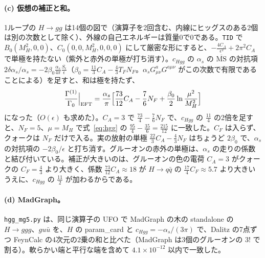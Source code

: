\documentclass[a4paper,10pt]{ltjsarticle}
\newcommand{\MSbar}{\overline{\mathrm{MS}}}
\begin{document}
\paragraph{(c) 仮想の補正と和。}1ループの $H\to gg$ は14個の図で（演算子を2回含む、内線にヒッグスのある2個は別の次数として除く）、外線の自己エネルギーは質量0で0である。\texttt{TID} で $B_0(M_H^2,0,0)$、$C_0(0,0,M_H^2,0,0,0)$ にして厳密な形にすると、$-\frac{4C_A}{\epsilon^2}+2\pi^2C_A$ で単極を持たない（紫外と赤外の単極が打ち消す）。$c_{Hgg}$ の $\alpha_s$ の $\MSbar$ の対抗項 $2\delta\alpha_s/\alpha_s=-2\beta_0\frac{\alpha_s}{4\pi}\frac{S_\epsilon}\epsilon$（$\beta_0=\frac{11}3C_A-\frac43T_FN_F$。$\alpha_sG^a_{\mu\nu}G^{a\mu\nu}$ がこの次数で有限であることによる）を足すと、和は極を持たず、
\begin{equation}
\frac{\Gamma^{(1)}}{\Gamma_0}\Big|_{\mathrm{EFT}}=\frac{\alpha_s}\pi\Bigl[\frac{73}{12}C_A-\frac76N_F+\frac{\beta_0}2\ln\frac{\mu^2}{M_H^2}\Bigr]
\label{eq:hggme}
\end{equation}
になった（$O(\epsilon)$ も求めた）。$C_A=3$ で $\frac{73}4-\frac76N_F$ で、$c_{Hgg}$ の $\frac{11}4$ の2倍を足すと、$N_F=5$、$\mu=M_H$ で式~\eqref{eq:hgg} の $\frac{95}4-\frac{35}6=\frac{215}{12}$ に一致した。$C_F$ は入らず、クォークは $N_F$ だけで入る。実の放射の単極 $\frac{22}3C_A-\frac43N_F$ はちょうど $2\beta_0$ で、$\alpha_s$ の対抗項の $-2\beta_0/\epsilon$ と打ち消す。グルーオンの赤外の単極は、$\alpha_s$ の走りの係数と結び付いている。補正が大きいのは、グルーオンの色の電荷 $C_A=3$ がクォークの $C_F=\frac43$ より大きく、係数 $\frac{73}{12}C_A\approx18$ が $H\to q\bar q$ の $\frac{17}4C_F\approx5.7$ より大きいうえに、$c_{Hgg}$ の $\frac{11}2$ が加わるからである。

\paragraph{(d) MadGraph。}\texttt{hgg\_mg5.py} は、同じ演算子の UFO で MadGraph の木の standalone の $H\to ggg$、$gu\bar u$ を、$H$ の param\_card と $c_{Hgg}=-\alpha_s/(3\pi)$ で、Dalitz の7点ずつ FeynCalc の4次元の2乗の和と比べた（MadGraph は3個のグルーオンの $3!$ で割る）。軟らかい端と平行な端を含めて $4.1\times10^{-12}$ 以内で一致した。
\end{document}
